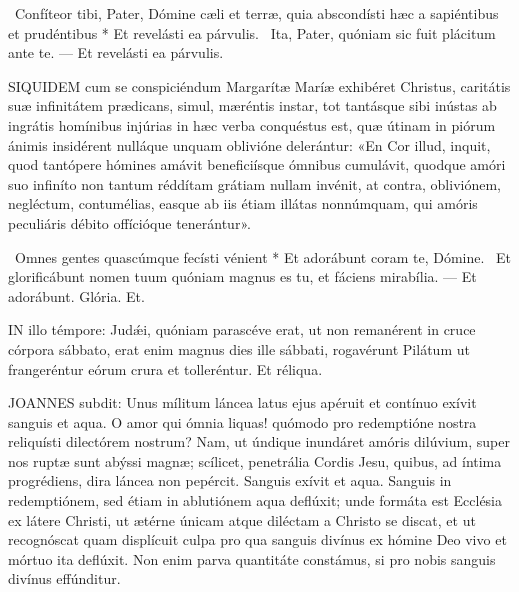 \R\ Confíteor tibi, Pater, Dómine cæli et terræ, quia abscondísti hæc a sapiéntibus et prudéntibus * Et revelásti ea párvulis. \V\ Ita, Pater, quóniam sic fuit plácitum ante te. --- Et revelásti ea párvulis.


\lettrine[lines=2]{S}{IQUIDEM} cum se conspiciéndum Margarítæ Maríæ exhibéret Christus, caritátis suæ infinitátem prædicans, simul, mæréntis instar, tot tantásque sibi inústas ab ingrátis homínibus injúrias in hæc verba conquéstus est, quæ útinam in piórum ánimis insidérent nulláque unquam oblivióne delerántur: «En Cor illud, inquit, quod tantópere hómines amávit beneficiísque ómnibus cumulávit, quodque amóri suo infiníto non tantum réddítam grátiam nullam invénit, at contra, obliviónem, negléctum, contumélias, easque ab iis étiam illátas nonnúmquam, qui amóris peculiáris débito offícióque tenerántur».

\R\ Omnes gentes quascúmque fecísti vénient * Et adorábunt coram te, Dómine. \V\ Et glorificábunt nomen tuum quóniam magnus es tu, et fáciens mirabília. --- Et adorábunt. Glória. Et.




\lettrine[lines=2]{I}{N} illo témpore: Judǽi, quóniam parascéve erat, ut non remanérent in cruce córpora sábbato, erat enim magnus dies ille sábbati, rogavérunt Pilátum ut frangeréntur eórum crura et tolleréntur. Et réliqua.



\lettrine[lines=2]{J}{OANNES} subdit: Unus mílitum láncea latus ejus apéruit et contínuo exívit sanguis et aqua. O amor qui ómnia liquas! quómodo pro redemptióne nostra reliquísti dilectórem nostrum? Nam, ut úndique inundáret amóris dilúvium, super nos ruptæ sunt abýssi magnæ; scílicet, penetrália Cordis Jesu, quibus, ad íntima progrédiens, dira láncea non pepércit. Sanguis exívit et aqua. Sanguis in redemptiónem, sed étiam in ablutiónem aqua deflúxit; unde formáta est Ecclésia ex látere Christi, ut ætérne únicam atque diléctam a Christo se discat, et ut recognóscat quam displícuit culpa pro qua sanguis divínus ex hómine Deo vivo et mórtuo ita deflúxit. Non enim parva quantitáte constámus, si pro nobis sanguis divínus effúnditur.

